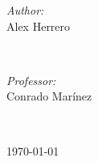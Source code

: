\begin{titlepage}
\begin{minipage}{0.4\textwidth}
\begin{flushleft} \large
\emph{Author:}\\
Alex Herrero \\
\end{flushleft}
\end{minipage}
~
\begin{minipage}{0.4\textwidth}
\begin{flushright} \large
\emph{Professor:} \\
Conrado Marínez
\end{flushright}
\end{minipage}\\[2cm]
\makeatother


\vspace{8cm}
{\large \today}\\[1cm] %

\vfill %

\end{titlepage}

